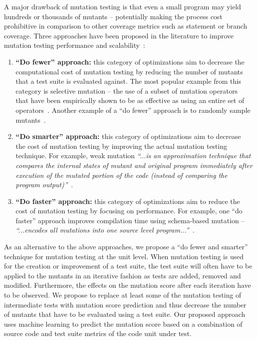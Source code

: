 \documentclass[10pt,conference,compsocconf]{IEEEtran}
\begin{document}
A major drawback of mutation testing is that even a small program may yield hundreds or thousands of mutants -- potentially making the process cost prohibitive in comparison to other coverage metrics such as statement or branch coverage. Three approaches have been proposed in the literature to improve mutation testing performance and scalability~\cite{OU00}:

\begin{enumerate}
  \item \textbf{``Do fewer'' approach:} this category of optimizations aim to decrease the computational cost of mutation testing by reducing the number of mutants that a test suite is evaluated against. The most popular example from this category is selective mutation -- the use of a subset of mutation operators that have been empirically shown to be as effective as using an entire set of operators~\cite{OLR+96}. Another example of a ``do fewer'' approach is to randomly sample mutants~\cite{Won93}.

  \item \textbf{``Do smarter'' approach:} this category of optimizations aim to decrease the cost of mutation testing by improving the actual mutation testing technique. For example, weak mutation \emph{``...is an approximation technique that compares the internal states of mutant and original program immediately after execution of the mutated portion of the code (instead of comparing the program output)''}~\cite{OU00}.

  \item \textbf{``Do faster'' approach:} this category of optimizations aim to reduce the cost of mutation testing by focusing on performance. For example, one ``do faster'' approach improves compilation time using schema-based mutation -- \emph{``...encodes all mutations into one source level program...''}~\cite{OU00}.
\end{enumerate}

As an alternative to the above approaches, we propose a ``do fewer and smarter'' technique for mutation testing at the unit level.  When mutation testing is used for the creation or improvement of a test suite,  the test suite will often have to be applied to the mutants in an iterative fashion as tests are added, removed and modified. Furthermore, the effects on the mutation score after each iteration have to be observed. We propose to replace at least some of the mutation testing of intermediate tests with mutation score prediction and thus decrease the number of mutants that have to be evaluated using a test suite. Our proposed approach uses machine learning to predict the mutation score based on a combination of source code and test suite metrics of the code unit under test.
\end{document}
